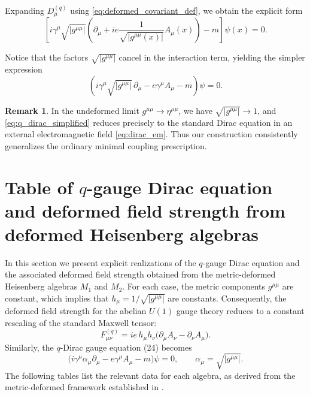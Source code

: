 \documentclass[12pt,a4paper]{article}
\theoremstyle{plain}
\theoremstyle{definition}
\newtheorem{remark}[theorem]{Remark}
\begin{document}
Expanding \(D_\mu^{(q)}\) using \eqref{eq:deformed_covariant_def}, we obtain the explicit form
\[
\left[ i \gamma^\mu\sqrt{|g^{\mu\mu}|} \left(\partial_\mu + ie \frac{1}{\sqrt{|g^{\mu\mu}(x)|}} A_\mu(x)\right) - m \right] \psi(x) = 0.
\]

Notice that the factors \(\sqrt{|g^{\mu\mu}|}\) cancel in the interaction term, yielding the simpler expression
\begin{equation}
\left( i \gamma^\mu \sqrt{|g^{\mu\mu}|}\,\partial_\mu - e \gamma^\mu A_\mu - m \right) \psi = 0. \label{eq:q_dirac_simplified}
\end{equation}

\begin{remark}
In the undeformed limit \(g^{\mu\mu} \to \eta^{\mu\mu}\), we have \(\sqrt{|g^{\mu\mu}|} \to 1\), and \eqref{eq:q_dirac_simplified} reduces precisely to the standard Dirac equation in an external electromagnetic field \eqref{eq:dirac_em}. Thus our construction consistently generalizes the ordinary minimal coupling prescription.
\end{remark}

\section{Table of $q$-gauge Dirac equation and deformed field strength from deformed Heisenberg algebras}
\label{sec:table-gauge-field}

In this section we present explicit realizations of the $q$-gauge Dirac equation and the associated deformed field strength obtained from the metric-deformed Heisenberg algebras $M_1$ and $M_2$. For each case, the metric components $g^{\mu\mu}$ are constant, which implies that $h_\mu = 1/\sqrt{|g^{\mu\mu}|}$ are constants. Consequently, the deformed field strength for the abelian $U(1)$ gauge theory reduces to a constant rescaling of the standard Maxwell tensor:
\begin{equation}\label{eq:scaled_field_strength}
F_{\mu\nu}^{(q)} = ie\, h_\mu h_\nu \bigl(\partial_\mu A_\nu - \partial_\nu A_\mu\bigr).
\end{equation}
Similarly, the $q$-Dirac gauge equation (24) becomes
\begin{equation}\label{eq:scaled_dirac_eq}
\bigl( i \gamma^\mu \alpha_\mu \partial_\mu - e \gamma^\mu A_\mu - m \bigr)\psi = 0,
\qquad \alpha_\mu = \sqrt{|g^{\mu\mu}|}.
\end{equation}
The following tables list the relevant data for each algebra, as derived from the metric-deformed framework established in \cite{Jaramillo2026a}.
\end{document}

